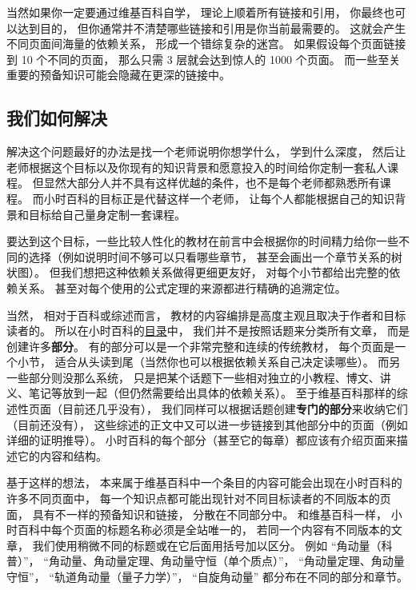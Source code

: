 当然如果你一定要通过维基百科自学， 理论上顺着所有链接和引用， 你最终也可以达到目的， 但你通常并不清楚哪些链接和引用是你当前最需要的。 这就会产生不同页面间海量的依赖关系， 形成一个错综复杂的迷宫。 如果假设每个页面链接到 10 个不同的页面， 那么只需 3 层就会达到惊人的 1000 个页面。 而一些至关重要的预备知识可能会隐藏在更深的链接中。

\subsection{我们如何解决}
解决这个问题最好的办法是找一个老师说明你想学什么， 学到什么深度， 然后让老师根据这个目标以及你现有的知识背景和愿意投入的时间给你定制一套私人课程。 但显然大部分人并不具有这样优越的条件，也不是每个老师都熟悉所有课程。 而小时百科的目标正是代替这样一个老师， 让每个人都能根据自己的知识背景和目标给自己量身定制一套课程。

要达到这个目标，一些比较人性化的教材在前言中会根据你的时间精力给你一些不同的选择（例如说明时间不够可以只看哪些章节， 甚至会画出一个章节关系的树状图）。 但我们想把这种依赖关系做得更细更友好， 对每个小节都给出完整的依赖关系。 甚至对每个使用的公式定理的来源都进行精确的追溯定位。

当然， 相对于百科或综述而言， 教材的内容编排是高度主观且取决于作者和目标读者的。 所以在小时百科的\href{http://wuli.wiki/online}{目录}中， 我们并不是按照话题来分类所有文章， 而是创建许多\textbf{部分}。 有的部分可以是一个非常完整和连续的传统教材， 每个页面是一个小节， 适合从头读到尾（当然你也可以根据依赖关系自己决定读哪些）。 而另一些部分则没那么系统， 只是把某个话题下一些相对独立的小教程、博文、讲义、笔记等放到一起（但仍然需要给出具体的依赖关系）。 至于维基百科那样的综述性页面（目前还几乎没有）， 我们同样可以根据话题创建\textbf{专门的部分}来收纳它们（目前还没有）， 这些综述的正文中又可以进一步链接到其他部分中的页面（例如详细的证明推导）。 小时百科的每个部分（甚至它的每章）都应该有介绍页面来描述它的内容和结构。

基于这样的想法， 本来属于维基百科中一个条目的内容可能会出现在小时百科的许多不同页面中， 每一个知识点都可能出现针对不同目标读者的不同版本的页面， 具有不一样的预备知识和链接， 分散在不同部分中。 和维基百科一样， 小时百科中每个页面的标题名称必须是全站唯一的， 若同一个内容有不同版本的文章， 我们使用稍微不同的标题或在它后面用括号加以区分。 例如 “角动量（科普）”， “角动量、角动量定理、角动量守恒（单个质点）”， “角动量定理、角动量守恒”， “轨道角动量（量子力学）”， “自旋角动量” 都分布在不同的部分和章节。

